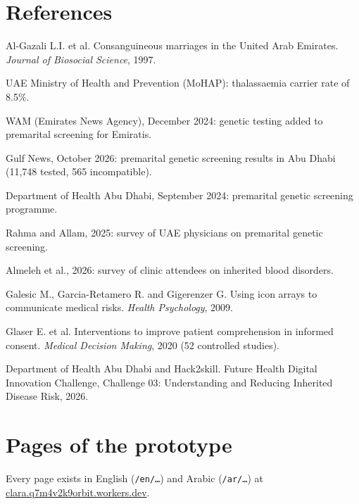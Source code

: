 \documentclass[10.5pt,a4paper]{article}
\newcommand{\chapterbreak}{}
\let\oldsection\section
\renewcommand{\section}{\chapterbreak\oldsection}
\newcommand{\code}[1]{\texttt{\small #1}}
\newcommand{\link}[2]{\href{#1}{\color{teal}#2}}
\newcommand{\proto}{https://clara.q7m4v2k9orbit.workers.dev}
\begin{document}
\section*{References}
{\small
\begin{enumerate}[label={[\arabic*]},leftmargin=22pt]
  \item Al-Gazali L.I. et al. Consanguineous marriages in the United Arab Emirates. \emph{Journal of Biosocial Science}, 1997.
  \item UAE Ministry of Health and Prevention (MoHAP): thalassaemia carrier rate of 8.5\%.
  \item WAM (Emirates News Agency), December 2024: genetic testing added to premarital screening for Emiratis.
  \item Gulf News, October 2026: premarital genetic screening results in Abu Dhabi (11,748 tested, 565 incompatible).
  \item Department of Health Abu Dhabi, September 2024: premarital genetic screening programme.
  \item Rahma and Allam, 2025: survey of UAE physicians on premarital genetic screening.
  \item Almeleh et al., 2026: survey of clinic attendees on inherited blood disorders.
  \item Galesic M., Garcia-Retamero R. and Gigerenzer G. Using icon arrays to communicate medical risks. \emph{Health Psychology}, 2009.
  \item Glaser E. et al. Interventions to improve patient comprehension in informed consent. \emph{Medical Decision Making}, 2020 (52 controlled studies).
  \item Department of Health Abu Dhabi and Hack2skill. Future Health Digital Innovation Challenge, Challenge 03: Understanding and Reducing Inherited Disease Risk, 2026.
\end{enumerate}}

\clearpage
\appendix
\renewcommand{\thesection}{\Alph{section}}
\section{Pages of the prototype}

Every page exists in English (\code{/en/…}) and Arabic (\code{/ar/…}) at \link{\proto}{clara.q7m4v2k9orbit.workers.dev}.
\end{document}
